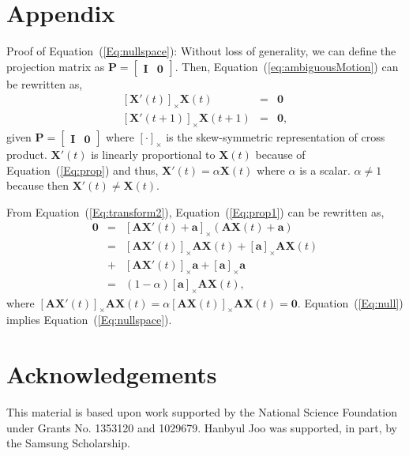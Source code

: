 \documentclass[10pt,twocolumn,letterpaper]{article}
\begin{document}



\section*{Appendix}
Proof of Equation~(\ref{Eq:nullspace}): Without loss of generality, we can define the projection matrix as $\mathbf{P} = \left[\begin{array}{cc}\mathbf{I}&\mathbf{0}\end{array}\right]$. Then, Equation~(\ref{eq:ambiguousMotion}) can be rewritten as,
\begin{eqnarray}
\left[\mathbf{X'}(t)\right]_\times \mathbf{X}(t) &=& \mathbf{0} \label{Eq:prop}\\
\left[\mathbf{X'}(t+1)\right]_\times \mathbf{X}(t+1) &=& \mathbf{0} \label{Eq:prop1},
\end{eqnarray}
given $\mathbf{P} = \left[\begin{array}{cc} \mathbf{I} & \mathbf{0} \end{array}\right]$ where $\left[\cdot\right]_\times$ is the skew-symmetric representation of cross product. $\mathbf{X'}(t)$ is linearly proportional to $\mathbf{X}(t)$ because of Equation~(\ref{Eq:prop}) and thus, $\mathbf{X'}(t) = \alpha \mathbf{X}(t)$ where $\alpha$ is a scalar. $\alpha \neq 1$ because then $\mathbf{X'}(t)\neq \mathbf{X}(t)$.

From Equation~(\ref{Eq:transform2}), Equation~(\ref{Eq:prop1}) can be rewritten as,
\begin{eqnarray}
\mathbf{0} &=& \left[\mathbf{A}\mathbf{X'}(t)+\mathbf{a}\right]_\times \left(\mathbf{A}\mathbf{X}(t)+\mathbf{a}\right)\nonumber\\
&=& \left[\mathbf{A}\mathbf{X'}(t)\right]_\times \mathbf{A}\mathbf{X}(t)+\left[\mathbf{a}\right]_\times \mathbf{A}\mathbf{X}(t)\nonumber\\
&+&\left[\mathbf{A}\mathbf{X'}(t)\right]_\times \mathbf{a}+\left[\mathbf{a}\right]_\times \mathbf{a}\nonumber\\
&=&(1-\alpha) \left[\mathbf{a}\right]_\times \mathbf{A}\mathbf{X}(t) \label{Eq:null},
\end{eqnarray}
where $
\left[\mathbf{A}\mathbf{X'}(t)\right]_\times \mathbf{A}\mathbf{X}(t)
=\alpha\left[\mathbf{A}\mathbf{X}(t)\right]_\times \mathbf{A}\mathbf{X}(t)
= \mathbf{0}\nonumber.$
Equation~(\ref{Eq:null}) implies Equation~(\ref{Eq:nullspace}). 

\section*{Acknowledgements}
This material is based upon work supported by the National Science Foundation under Grants No. 1353120 and 1029679. Hanbyul Joo was supported, in part, by the Samsung Scholarship. 

{\footnotesize


}
\end{document}
